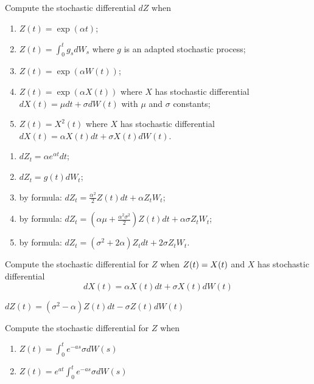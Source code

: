 \documentclass[12pt,a4paper]{exam}
\begin{document}
\begin{questions}
\begin{solution}
\begin{solution}
\question Compute the stochastic differential $dZ$ when
\begin{enumerate}[label=(\alph*),font=\itshape]
\item $Z(t) = \exp(\alpha t)$;
\item $Z(t) = \int_0^t g_s dW_s$ where $g$ is an adapted stochastic process;
\item $Z(t) = \exp(\alpha W(t))$;
\item $Z(t) = \exp(\alpha X(t))$ where $X$ has stochastic differential $dX(t)=\mu dt + \sigma dW(t)$ with $\mu$ and $\sigma$ constants;
\item $Z(t) = X^2(t)$ where $X$ has stochastic differential $dX(t)=\alpha X(t)dt + \sigma X(t)dW(t)$.
\end{enumerate}
\fillwithlines{3cm}

\begin{solution}
\begin{enumerate}[label=(\alph*),font=\itshape]
\item $dZ_t= \alpha e^{\alpha t}dt$;
\item $dZ_t = g(t) dW_t$;
\item by \ito formula: $dZ_t = \frac{\alpha^2}{2}Z(t)dt + \alpha Z_t W_t$;
\item by \ito formula: $dZ_t = (\alpha\mu + \frac{\alpha^2\sigma^2}{2})Z(t)dt + \alpha \sigma Z_t W_t$;
\item by \ito formula: $dZ_t = (\sigma^2 + 2\alpha)Z_t dt + 2\sigma Z_t W_t$.
\end{enumerate}
\end{solution}

\question Compute the stochastic differential for $Z$ when $Z(t) = \/X(t)$ and $X$ has stochastic differential 
\begin{equation*}
dX(t) = \alpha X(t) dt + \sigma X(t) dW(t)
\end{equation*}
\fillwithlines{3cm}
\begin{solution}
$dZ(t)=(\sigma^2 - \alpha)Z(t)dt -\sigma Z(t)dW(t)$
\end{solution}

\question Compute the stochastic differential for $Z$ when
\begin{enumerate}[label=(\alph*),font=\itshape]
\item $Z(t) = \int_0^t e^{-as}\sigma dW(s)$
\item $Z(t) = e^{at}\int_0^t e^{-as}\sigma dW(s)$
\end{enumerate}
\fillwithlines{3cm}


\end{solution}
\end{solution}
\end{questions}
\end{document}
